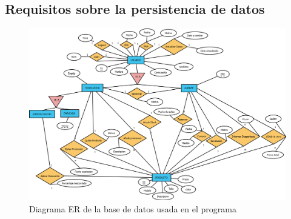 \subsection{Requisitos sobre la persistencia de datos}
\label{sec:req_pers_dat}
\begin{figure}[H]
	\centering
	\includegraphics[width=\textwidth]{images/DiagramaER.png}
	\caption{Diagrama ER de la base de datos usada en el programa}
\end{figure}

